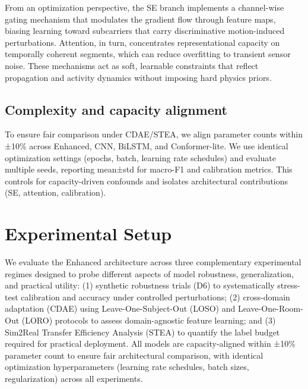 \documentclass[journal]{IEEEtran}
\begin{document}
From an optimization perspective, the SE branch implements a channel-wise gating mechanism that modulates the gradient flow through feature maps, biasing learning toward subcarriers that carry discriminative motion-induced perturbations. Attention, in turn, concentrates representational capacity on temporally coherent segments, which can reduce overfitting to transient sensor noise. These mechanisms act as soft, learnable constraints that reflect propagation and activity dynamics without imposing hard physics priors.

\subsection{Complexity and capacity alignment}
To ensure fair comparison under CDAE/STEA, we align parameter counts within ±10\% across Enhanced, CNN, BiLSTM, and Conformer-lite. We use identical optimization settings (epochs, batch, learning rate schedules) and evaluate multiple seeds, reporting mean±std for macro-F1 and calibration metrics. This controls for capacity-driven confounds and isolates architectural contributions (SE, attention, calibration).

\section{Experimental Setup}
We evaluate the Enhanced architecture across three complementary experimental regimes designed to probe different aspects of model robustness, generalization, and practical utility: (1) synthetic robustness trials (D6) to systematically stress-test calibration and accuracy under controlled perturbations; (2) cross-domain adaptation (CDAE) using Leave-One-Subject-Out (LOSO) and Leave-One-Room-Out (LORO) protocols to assess domain-agnostic feature learning; and (3) Sim2Real Transfer Efficiency Analysis (STEA) to quantify the label budget required for practical deployment. All models are capacity-aligned within ±10\% parameter count to ensure fair architectural comparison, with identical optimization hyperparameters (learning rate schedules, batch sizes, regularization) across all experiments.
\end{document}
